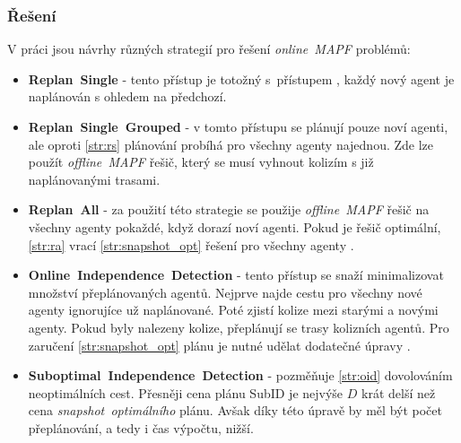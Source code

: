 %

\subsubsection{Řešení~}\label{subsubsec:reseni_online_mapf}




V práci \citet{Svancara} jsou návrhy různých strategií pro řešení \emph{online~MAPF} problémů:
\begin{itemize}
	\item \textbf{Replan~Single} - tento přístup je totožný s~přístupem ,
	každý nový agent je naplánován s ohledem na předchozí.
	\item \textbf{Replan~Single~Grouped}\label{par:replan_single_grouped} -
	v tomto přístupu se plánují pouze noví agenti, ale oproti \ref{str:rs} plánování probíhá pro všechny agenty najednou.
	Zde lze použít \emph{offline~MAPF} řešič, který se musí vyhnout kolizím s již naplánovanými trasami.
	\item \textbf{Replan~All} - za použití této strategie se použije
	\emph{offline~MAPF} řešič na všechny agenty pokaždé, když dorazí noví agenti.
	Pokud je řešič optimální, \ref{str:ra} vrací \ref{str:snapshot_opt} řešení pro všechny agenty \citep{Svancara}.
	\item \textbf{Online~Independence~Detection} - tento přístup se snaží minimalizovat množství přeplánovaných agentů.
	Nejprve najde cestu pro všechny nové agenty ignorujíce už naplánované.
	Poté zjistí kolize mezi starými a novými agenty.
	Pokud byly nalezeny kolize, přeplánují se trasy kolizních agentů.
	Pro zaručení \ref{str:snapshot_opt} plánu je nutné udělat dodatečné úpravy \citep{Svancara}.
	\item \textbf{Suboptimal~Independence~Detection} - pozměňuje \ref{str:oid} dovolováním neoptimálních cest.
	Přesněji cena plánu SubID je nejvýše $D$ krát delší než cena \emph{snapshot~optimálního} plánu.
	Avšak díky této úpravě by měl být počet přeplánování, a tedy i čas výpočtu, nižší.
\end{itemize}


